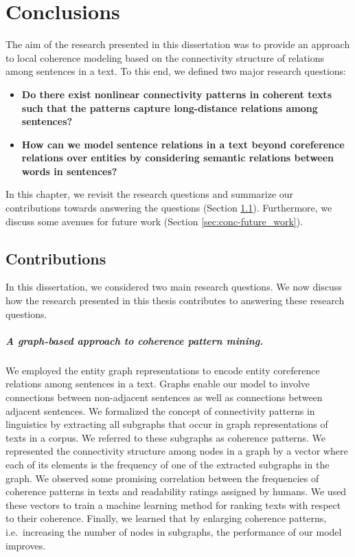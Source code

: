 
\chapter{Conclusions} 
\label{ch:conc} 

The aim of the research presented in this dissertation was to provide an approach to local coherence modeling based on the connectivity structure of relations among sentences in a text.  
To this end, we defined two major research questions: 
\begin{itemize}
	\item \textbf{Do there exist nonlinear connectivity patterns in coherent texts such that the patterns capture \mbox{long-distance} relations among sentences?} 

	\item \textbf{How can we model sentence relations in a text beyond coreference relations over entities by considering semantic relations between words in sentences?} 
\end{itemize}

In this chapter, we revisit the research questions and summarize our contributions towards answering the questions (Section \ref{sec:conc-contributions}). 
Furthermore, we discuss some avenues for future work (Section \ref{sec:conc-future_work}).

\section{Contributions}
\label{sec:conc-contributions}

In this dissertation, we considered two main research questions. 
We now discuss how the research presented in this thesis contributes to answering these research questions.

\paragraph{A graph-based approach to coherence pattern mining.} 
We employed the entity graph representations to encode entity coreference relations among sentences in a text. 
Graphs enable our model to involve connections between non-adjacent sentences as well as connections between adjacent sentences. 
We formalized the concept of connectivity patterns in linguistics \cite{danes74a,stoddard91} by extracting all subgraphs that occur in graph representations of texts in a corpus. 
We referred to these subgraphs as coherence patterns. 
We represented the connectivity structure among nodes in a graph by a vector where each of its elements is the frequency of one of the extracted subgraphs in the graph. 
We observed some promising correlation between the frequencies of coherence patterns in texts and readability ratings assigned by humans. 
We used these vectors to train a machine learning method for ranking texts with respect to their coherence. 
Finally, we learned that by enlarging coherence patterns, i.e.\ increasing the number of nodes in subgraphs, the performance of our model improves. 

